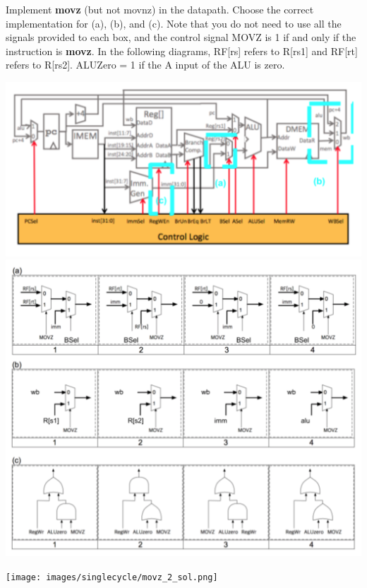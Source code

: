 \begin{blocksection}

\question
Implement \textbf{movz} (but not movnz) in the datapath. Choose the correct implementation for (a), (b), and (c). Note that you do not need to use all the signals provided to each box, and the control signal MOVZ is 1 if and only if the instruction is \textbf{movz}. In the following diagrams, RF[rs] refers to R[rs1] and RF[rt] refers to R[rs2]. ALUZero = 1 if the A input of the ALU is zero.


\includegraphics[width=\textwidth]{images/singlecycle/movz_1.png}
\includegraphics[width=\textwidth]{images/singlecycle/movz_2.png}


\begin{solution}[0.5in]
 \texttt{[image: images/singlecycle/movz\_2\_sol.png]}
\end{solution}

\end{blocksection}